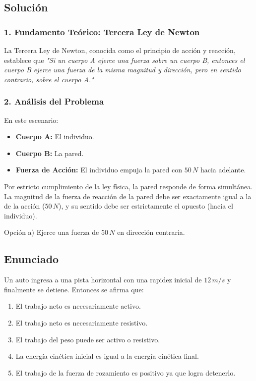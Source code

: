 \documentclass[12pt, a4paper]{article}
\begin{document}
\subsection*{Solución}

\subsubsection*{1. Fundamento Teórico: Tercera Ley de Newton}
La Tercera Ley de Newton, conocida como el principio de acción y reacción, establece que \textit{"Si un cuerpo A ejerce una fuerza sobre un cuerpo B, entonces el cuerpo B ejerce una fuerza de la misma magnitud y dirección, pero en sentido contrario, sobre el cuerpo A."}

\subsubsection*{2. Análisis del Problema}
En este escenario:
\begin{itemize}
    \item \textbf{Cuerpo A:} El individuo.
    \item \textbf{Cuerpo B:} La pared.
    \item \textbf{Fuerza de Acción:} El individuo empuja la pared con $50 \, \si{N}$ hacia adelante.
\end{itemize}

Por estricto cumplimiento de la ley física, la pared responde de forma simultánea. La magnitud de la fuerza de reacción de la pared debe ser exactamente igual a la de la acción ($50 \, \si{N}$), y su sentido debe ser estrictamente el opuesto (hacia el individuo). 

\begin{tcolorbox}[colback=green!5!white, colframe=green!50!black, title=Respuesta Final]
\centering Opción a) Ejerce una fuerza de $50 \, \si{N}$ en dirección contraria.
\end{tcolorbox}

\newpage

\subsection*{Enunciado}
Un auto ingresa a una pista horizontal con una rapidez inicial de $12 \, \si{m/s}$ y finalmente se detiene. Entonces se afirma que:
\begin{enumerate}[label=\alph*)]
    \item El trabajo neto es necesariamente activo.
    \item El trabajo neto es necesariamente resistivo.
    \item El trabajo del peso puede ser activo o resistivo.
    \item La energía cinética inicial es igual a la energía cinética final.
    \item El trabajo de la fuerza de rozamiento es positivo ya que logra detenerlo.
\end{enumerate}
\end{document}
